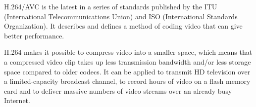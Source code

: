 \documentclass[../main.tex]{subfiles}
\begin{document}
H.264/AVC is the latest in a series of standards published by the ITU (International Telecommunications Union) and ISO (International Standards Organization). 
It describes and defines a method of coding video that can give better performance.

H.264 makes it possible to compress video into a smaller space, which means that a compressed video clip takes up less transmission bandwidth and/or less storage space compared to older codecs. 
It can be applied to transmit HD television over a limited-capacity broadcast channel, to record hours of video on a flash memory card and to deliver massive numbers of video streams over an already busy Internet.
\end{document}

